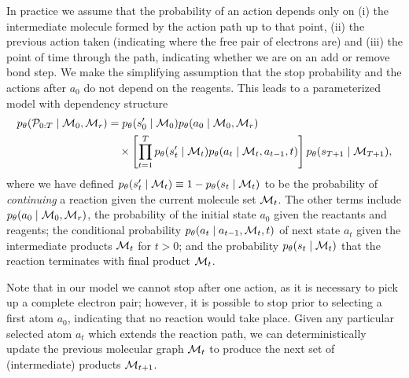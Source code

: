 In practice we assume that the probability of an action depends only on (i) the intermediate molecule formed by the action path up to that point, (ii) the previous action taken (indicating where the free pair of electrons are) and (iii) the point of time through the path, indicating whether we are on an add or remove bond step. 
We make the simplifying assumption that the stop probability and the actions after $a_0$ do not depend on the reagents. This leads to a parameterized model with dependency structure
\begin{align}
\label{eq:jointprob}
p_\theta({\mathcal{P}}_{0:T} \mid {\mathcal{M}}_0, {\mathcal{M}}_r) 
&=
	p_\theta(s'_0 \mid {\mathcal{M}}_0)
	p_\theta(a_0 \mid {\mathcal{M}}_0, {\mathcal{M}}_r)\\ \nonumber &\quad \times
	\left[\prod_{t=1}^{T}
		p_\theta(s_{t}' \mid {\mathcal{M}}_{t})
		p_\theta(a_t \mid {\mathcal{M}}_{t}, a_{t-1}, t)
	\right]
	p_\theta(s_{T+1} \mid {\mathcal{M}}_{T+1})
	,
\end{align}
where we have defined $p_\theta(s'_t \mid {\mathcal{M}}_t) \equiv 1 - p_\theta(s_t \mid {\mathcal{M}}_t)$ to be the probability of {\em continuing} a reaction given the current molecule set ${\mathcal{M}}_t$.
The other terms include $p_\theta(a_0 \mid {\mathcal{M}}_0, {\mathcal{M}}_r)$, the probability of the initial state $a_0$ given the reactants and reagents; 
the conditional probability $p_\theta(a_t \mid a_{t-1}, {\mathcal{M}}_t, t)$ 
of next state $a_t$ given the intermediate products ${\mathcal{M}}_t$ for $t > 0$;
and the probability $p_\theta(s_t \mid {\mathcal{M}}_t)$ that the reaction terminates with final product ${\mathcal{M}}_{t}$.

%
%
%
Note that in our model we cannot stop after one action, as it is necessary to pick up a complete electron pair;
however, it is possible to stop prior to selecting a first atom $a_0$, indicating that no reaction would take place.
Given any particular selected atom $a_t$ which extends the reaction path, we can deterministically update the previous molecular graph ${\mathcal{M}}_{t}$ to produce the next set of (intermediate) products ${\mathcal{M}}_{t+1}$.

